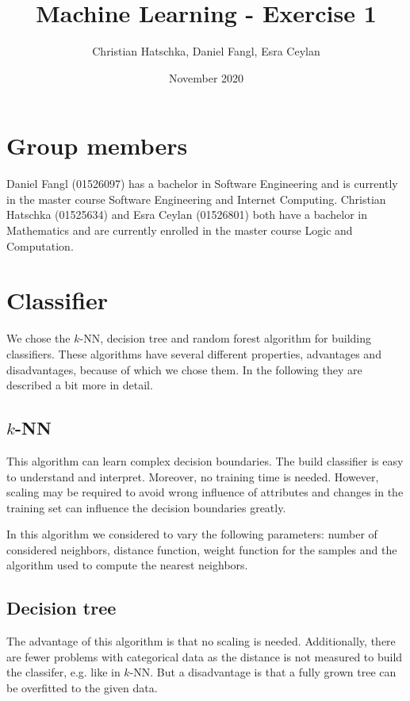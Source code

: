 \documentclass[a4paper,11pt]{article}
\title{Machine Learning - Exercise 1}
\author{Christian Hatschka, Daniel Fangl, Esra Ceylan}
\date{November 2020}
\begin{document}
\maketitle
\section{Group members}
    Daniel Fangl (01526097) has a bachelor in Software Engineering and is currently in the master course Software Engineering and Internet Computing. Christian Hatschka (01525634) and Esra Ceylan (01526801) both have a bachelor in Mathematics and are currently enrolled in the master course Logic and Computation.
    
\section{Classifier} 
    We chose the $k$-NN, decision tree and random forest algorithm for building classifiers. These algorithms have several different properties, advantages and disadvantages, because of which we chose them. In the following they are described a bit more in detail.
    
    \subsection*{$k$-NN}
        This algorithm can learn complex decision boundaries. The build classifier is easy to understand and interpret. Moreover, no training time is needed. However, scaling may be required to avoid wrong influence of attributes and changes in the training set can influence the decision boundaries greatly. 
        
        In this algorithm we considered to vary the following parameters: number of considered neighbors, distance function, weight function for the samples and the algorithm used to compute the nearest neighbors.
    
        
    \subsection*{Decision tree}
        The advantage of this algorithm is that no scaling is needed. Additionally, there are fewer problems with categorical data as the distance is not measured to build the classifer, e.g. like in $k$-NN. But a disadvantage is that a fully grown tree can be overfitted to the given data. 
        
\end{document}
